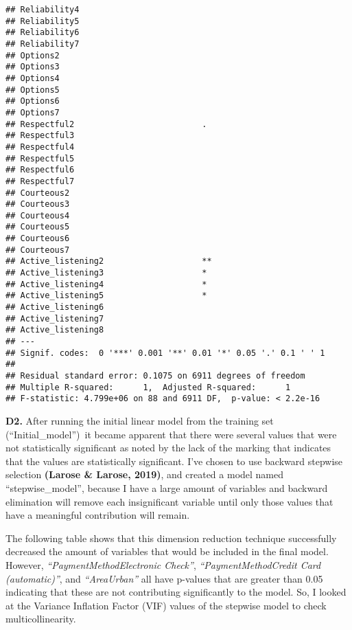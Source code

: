 \documentclass[
]{article}
\makeatletter
\newcommand*\pandocbounded[1]{%
  \sbox\pandoc@box{#1}%
  \Gscale@div\@tempa{\textheight}{\dimexpr\ht\pandoc@box+\dp\pandoc@box\relax}%
  \Gscale@div\@tempb{\linewidth}{\wd\pandoc@box}%
  \ifdim\@tempb\p@<\@tempa\p@\let\@tempa\@tempb\fi%
  \ifdim\@tempa\p@<\p@\scalebox{\@tempa}{\usebox\pandoc@box}%
  \else\usebox{\pandoc@box}%
  \fi%
}
\makeatother
\begin{document}
\begin{verbatim}
## Reliability4                            
## Reliability5                            
## Reliability6                            
## Reliability7                            
## Options2                                
## Options3                                
## Options4                                
## Options5                                
## Options6                                
## Options7                                
## Respectful2                          .  
## Respectful3                             
## Respectful4                             
## Respectful5                             
## Respectful6                             
## Respectful7                             
## Courteous2                              
## Courteous3                              
## Courteous4                              
## Courteous5                              
## Courteous6                              
## Courteous7                              
## Active_listening2                    ** 
## Active_listening3                    *  
## Active_listening4                    *  
## Active_listening5                    *  
## Active_listening6                       
## Active_listening7                       
## Active_listening8                       
## ---
## Signif. codes:  0 '***' 0.001 '**' 0.01 '*' 0.05 '.' 0.1 ' ' 1
## 
## Residual standard error: 0.1075 on 6911 degrees of freedom
## Multiple R-squared:      1,  Adjusted R-squared:      1 
## F-statistic: 4.799e+06 on 88 and 6911 DF,  p-value: < 2.2e-16
\end{verbatim}

\textbf{D2.} After running the initial linear model from the training
set (``Initial\_model'')~it became apparent that there were several
values that were not statistically significant as noted by the lack of
the
\pandocbounded{\texttt{[image: https://lh7-rt.googleusercontent.com/docsz/AD\_4nXe5VNjtMQSILD2pI0shhZtLtH-9os-62mspk6YayIYbUurztTNQUyfDP2EmJ2m7opZnO7gK8RrpsRGNV0X26vtSuR9NOBJ-d609ViFOYEhBXcD74x4CWnmGkHASh3iQqP5szgZmww?key=SXQIj9I0Eg3DnjP4XZcTs35-]}}marking
that indicates that the values are statistically significant. I've
chosen to use backward stepwise selection \textbf{(Larose \& Larose,
2019)}, and created a model named ``stepwise\_model'', because I have a
large amount of variables and backward elimination will remove each
insignificant variable until only those values that have a meaningful
contribution will remain.~

The following table shows that this dimension reduction technique
successfully decreased the amount of variables that would be included in
the final model. However, \emph{``PaymentMethodElectronic Check''},
\emph{``PaymentMethodCredit Card (automatic)''}, and
\emph{``AreaUrban''} all have p-values that are greater than 0.05
indicating that these are not contributing significantly to the model.
So, I looked at the Variance Inflation Factor (VIF) values of the
stepwise model to check multicollinearity.~
\end{document}
